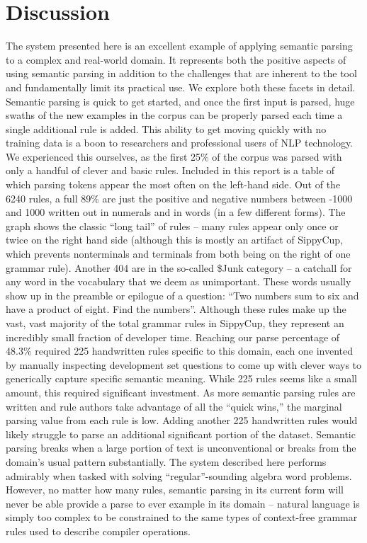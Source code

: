 \documentclass[11pt]{article}
\begin{document}
\section{Discussion}
The system presented here is an excellent example of applying semantic parsing to a complex and real-world domain. It represents both the positive aspects of using semantic parsing in addition to the challenges that are inherent to the tool and fundamentally limit its practical use. We explore both these facets in detail. Semantic parsing is quick to get started, and once the first input is parsed, huge swaths of the new examples in the corpus can be properly parsed each time a single additional rule is added. This ability to get moving quickly with no training data is a boon to researchers and professional users of NLP technology. We experienced this ourselves, as the first 25\% of the corpus was parsed with only a handful of clever and basic rules.
Included in this report is a table of which parsing tokens appear the most often on the left-hand side. Out of the 6240 rules, a full 89\% are just the positive and negative numbers between -1000 and 1000 written out in numerals and in words (in a few different forms). The graph shows the classic ``long tail'' of rules -- many rules appear only once or twice on the right hand side (although this is mostly an artifact of SippyCup, which prevents nonterminals and terminals from both being on the right of one grammar rule). Another 404 are in the so-called \$Junk category -- a catchall for any word in the vocabulary that we deem as unimportant. These words usually show up in the preamble or epilogue of a question: ``Two numbers sum to six and have a product of eight. Find the numbers''. Although these rules make up the vast, vast majority of the total grammar rules in SippyCup, they represent an incredibly small fraction of developer time.
Reaching our parse percentage of 48.3\% required 225 handwritten rules specific to this domain, each one invented by manually inspecting development set questions to come up with clever ways to generically capture specific semantic meaning. While 225 rules seems like a small amount, this required significant investment. As more semantic parsing rules are written and rule authors take advantage of all the ``quick wins,'' the marginal parsing value from each rule is low. Adding another 225 handwritten rules would likely struggle to parse an additional significant portion of the dataset.
Semantic parsing breaks when a large portion of text is unconventional or breaks from the domain’s usual pattern substantially. The system described here performs admirably when tasked with solving ``regular''-sounding algebra word problems. However, no matter how many rules, semantic parsing in its current form will never be able provide a parse to ever example in its domain -- natural language is simply too complex to be constrained to the same types of context-free grammar rules used to describe compiler operations.
\end{document}
